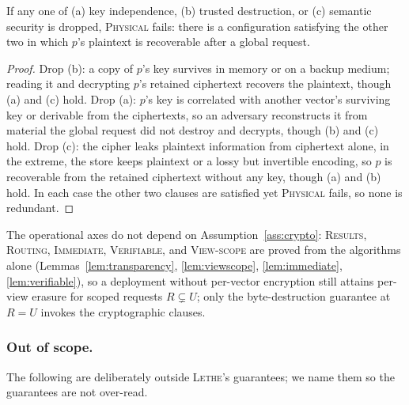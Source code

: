 \documentclass[sigconf, nonacm, review]{acmart}
\begin{document}
\begin{proposition}
\label{prop:assumption-necessity}
If any one of (a) key independence, (b) trusted destruction, or (c) semantic
security is dropped, \textsc{Physical} fails: there is a configuration
satisfying the other two in which $p$'s plaintext is recoverable after a global
request.
\end{proposition}
\begin{proof}
Drop (b): a copy of $p$'s key survives in memory or on a backup medium; reading
it and decrypting $p$'s retained ciphertext recovers the plaintext, though (a)
and (c) hold. Drop (a): $p$'s key is correlated with another vector's
surviving key or derivable from the ciphertexts, so an adversary reconstructs
it from material the global request did not destroy and decrypts, though (b)
and (c) hold. Drop (c): the cipher leaks plaintext information from ciphertext
alone, in the extreme, the store keeps plaintext or a lossy but invertible
encoding, so $p$ is recoverable from the retained ciphertext without any
key, though (a) and (b) hold. In each case the other two clauses are satisfied
yet \textsc{Physical} fails, so none is redundant.
\end{proof}

The operational axes do not depend on Assumption~\ref{ass:crypto}:
\textsc{Results}, \textsc{Routing}, \textsc{Immediate}, \textsc{Verifiable},
and \textsc{View-scope} are proved from the algorithms alone
(Lemmas~\ref{lem:transparency}, \ref{lem:viewscope}, \ref{lem:immediate},
\ref{lem:verifiable}), so a deployment without per-vector encryption still
attains per-view erasure for scoped requests $R\subsetneq U$; only the
byte-destruction guarantee at $R=U$ invokes the cryptographic clauses.

\subsubsection{Out of scope.}
\label{app:scope-out}
The following are deliberately outside \textsc{Lethe}'s guarantees; we name them
so the guarantees are not over-read.
\end{document}
